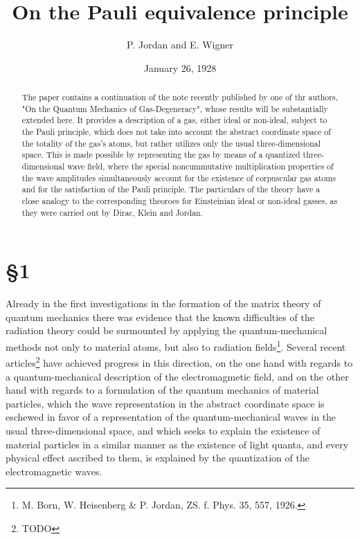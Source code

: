 \documentclass{article}
\title{On the Pauli equivalence principle}
\author{P. Jordan and E. Wigner}
\date{January 26, 1928}
\begin{document}
\maketitle

\begin{abstract}
The paper contains a continuation of the note recently published by one of thr authors, "On the Quantum Mechanics of Gas-Degeneracy", whose results will be substantially extended here. It provides a description of a gas, either ideal or non-ideal, subject to the Pauli principle, which does not take into account the abstract coordinate space of the totality of the gas's atoms, but rather utilizes only the usual three-dimensional space. This is made possible by representing the gas by means of a quantized three-dimensional wave field, where the special noncummutative multiplication properties of the wave amplitudes simultaneously account for the existence of corpuscular gas atoms and for the satisfaction of the Pauli principle. The particulars of the theory have a close analogy to the corresponding theoroes for Einsteinian ideal or non-ideal gasses, as they were carried out by Dirac, Klein and Jordan.
\end{abstract}

\section*{§1}
Already in the first investigations in the formation of the matrix theory of quantum mechanics there was evidence that the known difficulties of the radiation theory could be surmounted by applying the quantum-mechanical methods not only to material atoms, but also to radiation fields\footnote{M. Born, W. Heisenberg \& P. Jordan, ZS. f. Phys. 35, 557, 1926.}. Several recent articles\footnote{TODO} have achieved progress in this direction, on the one hand with regards to a quantum-mechanical description of the electromagmetic field, and on the other hand with regards to a formulation of the quantum mechanics of material particles, which the wave representation in the abstract coordinate space is eschewed in favor of a representation of the quantum-mechanical waves in the usual three-dimensional space, and which seeks to explain the existence of material particles in a similar manner as the existence of light quanta, and every physical effect ascribed to them, is explained by the quantization of the electromagnetic waves.
\end{document}
